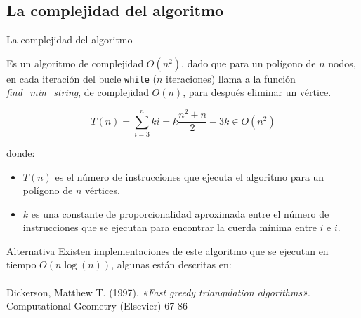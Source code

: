 \documentclass[compress]{beamer}
\begin{document}
\subsection{La complejidad del algoritmo}
\begin{frame}{La complejidad del algoritmo}


Es un algoritmo de complejidad $O(n^2)$, dado que para un polígono de $n$ nodos, en cada iteración del bucle \texttt{while} ($n$ iteraciones) llama a la función \textit{find\_min\_string}, de complejidad $O(n)$, para después eliminar un vértice.

\[
T(n) = \sum_{i=3}^n ki = k\frac{n^2+n}{2} - 3k \in O(n^2)
\]

donde:
\begin{itemize}
\item $T(n)$ es el número de instrucciones que ejecuta el algoritmo para un polígono de $n$ vértices.
\item $k$ es una constante de proporcionalidad aproximada entre el número de instrucciones que se ejecutan para encontrar la cuerda mínima entre $i$ e $i$. 

\end{itemize}
\end{frame}

\begin{frame}{Alternativa}
Existen implementaciones de este algoritmo que se ejecutan en tiempo $O(n\log(n))$, algunas están descritas en:
\hfill\\\hfill\\
Dickerson, Matthew T. (1997). \textit{«Fast greedy triangulation algorithms»}. Computational Geometry (Elsevier)  67-86
\end{frame}
\end{document}
